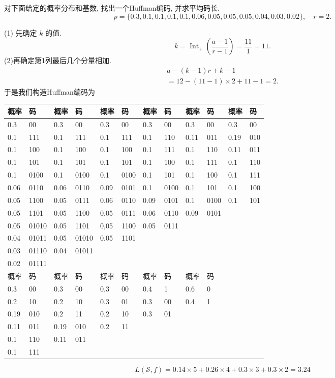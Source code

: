 \begin{exercise}
 对下面给定的概率分布和基数, 找出一个Huffman编码, 并求平均码长.
$$
p=\{0.3,0.1,0.1,0.1,0.1,0.06,0.05,0.05,0.05,0.04,0.03,0.02\},
\quad r=2 .
$$
\end{exercise}
\begin{solution}
(1) 先确定 ${k} $ 的值.
$$
k=\operatorname{I n t}_{+}\left(\frac{a-1}{r-1}\right)=\frac{11}{1}=11 .
$$
(2)再确定第1列最后几个分量相加.
$$
\begin{array}{l}
a-(k-1) r+k-1 \\
=12-(11-1) \times 2+11-1=2 .
\end{array}
$$
于是我们构造Huffman编码为
\begin{center}
\begin{tabular}{ll||ll||ll||ll||ll||ll} 
\hline
概率 & 码 & 概率 & 码 & 概率 & 码 &概率 & 码 & 概率 & 码 & 概率 & 码 \\
\hline
0.3 & 00 & 0.3 & 00 & 0.3 & 00 &0.3 & 00 & 0.3 & 00 & 0.3 & 00 \\
0.1 & 111 & 0.1 & 111 & 0.1 & 111 &$ \boxed{0.1} $ & 110 & $ \boxed{0.11} $ & 011 & $ \boxed{0.19} $ & 010 \\
0.1 & 100 & 0.1 & 100 & 0.1 & 100 &0.1 & 111 & 0.1 & 110 & 0.11 & 011 \\
0.1 & 101 & 0.1 & 101 & 0.1 & 101 &0.1 & 100 & 0.1 & 111 & 0.1 & 110 \\
0.1 & 0100 & 0.1 & 0100 & 0.1 & 0100 &0.1 & 101 & 0.1 & 100 & 0.1 & 111 \\
0.06 & 0110 & 0.06 & 0110 & $ \boxed{0.09} $ & 0101 &0.1 & 0100 & 0.1 & 101 & 0.1 & 100 \\
0.05 & 1100 & $ \boxed{0.05} $ & 0111 & 0.06 & 0110 &0.09 & 0101 & 0.1 & 0100 & 0.1 & 101 \\
0.05 & 1101 & 0.05 & 1100 & 0.05 & 0111 &0.06 & 0110 & 0.09 & 0101 & & \\
0.05 & 01010 & 0.05 & 1101 & 0,05 & 1100 &0.05 & 0111 & & & &\\
0.04 & 01011 & 0.05 & 01010 & 0.05 & 1101 & & & & & &\\
0.03 & 01110 & 0.04 & 01011 & & & & & & & &\\
0.02 & 01111 & & & & & & & & &\\
\hline
\hline
概率 & 码 & 概率 & 码 & 概率 & 码 &概率 & 码 & 概率 & 码 & & \\
\hline
0.3 & 00 & 0.3 & 00 & 0.3 & 00 &0.4 & 1 & $ \boxed{0.6} $ & 0 & &\\
0.2 & 10 & 0.2 & 10 & $ \boxed{0.3} $ & 01 &0.3 & 00 & 0.4 & 1 & & \\
0.19 & 010$\quad$ & $ \boxed{0.2} $ & 11 & 0.2 & 10 &0.3 & 01 & & & & \\
0.11 & 011 & 0.19 & 010$\quad$ & 0.2 & 11 & & & & & & \\
0.1 & 110 & 0.11 & 011$\quad$ & & & & & & &\\
0.1 & 111 & & & & & & & & & &\\
\hline
\end{tabular}
\end{center}
$$ L(\mathscr{S}, f)=0.14 \times 5+0.26 \times 4+0.3 \times 3+0.3 \times 2=3.24 $$
\end{solution}


